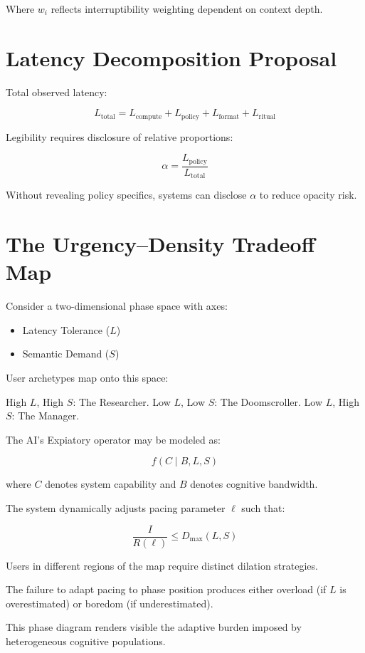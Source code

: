 \documentclass[12pt]{article}
\begin{document}
Where $w_i$ reflects interruptibility weighting dependent on context depth.

\section{Latency Decomposition Proposal}

Total observed latency:

\[
L_{\text{total}} = L_{\text{compute}} + L_{\text{policy}} + L_{\text{format}} + L_{\text{ritual}}
\]

Legibility requires disclosure of relative proportions:

\[
\alpha = \frac{L_{\text{policy}}}{L_{\text{total}}}
\]

Without revealing policy specifics, systems can disclose $\alpha$ to reduce opacity risk.


\section{The Urgency--Density Tradeoff Map}

Consider a two-dimensional phase space with axes:

\begin{itemize}
\item Latency Tolerance ($L$)
\item Semantic Demand ($S$)
\end{itemize}

User archetypes map onto this space:

High $L$, High $S$: The Researcher.  
Low $L$, Low $S$: The Doomscroller.  
Low $L$, High $S$: The Manager.  

The AI’s Expiatory operator may be modeled as:

\[
f(C \mid B, L, S)
\]

where $C$ denotes system capability and $B$ denotes cognitive bandwidth.

The system dynamically adjusts pacing parameter $\ell$ such that:

\[
\frac{I}{R(\ell)} \leq D_{\max}(L,S)
\]

Users in different regions of the map require distinct dilation strategies.

The failure to adapt pacing to phase position produces either overload (if $L$ is overestimated) or boredom (if underestimated).

This phase diagram renders visible the adaptive burden imposed by heterogeneous cognitive populations.
\end{document}
